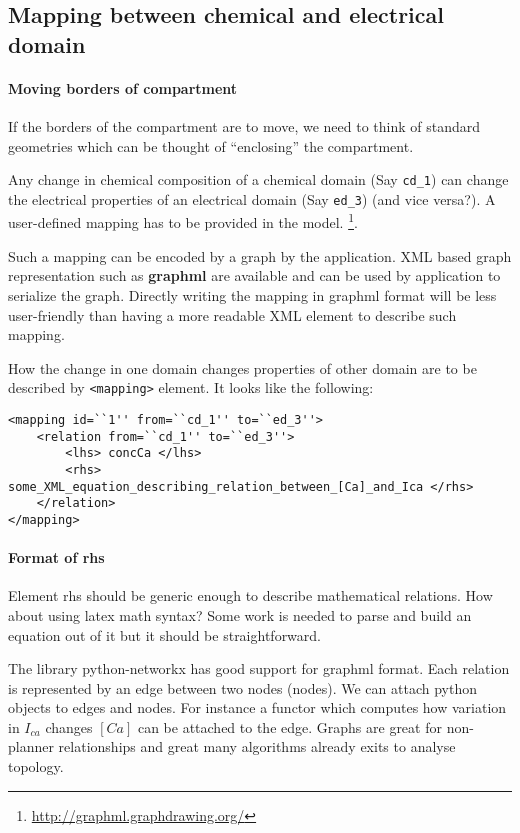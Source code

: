 \subsection{Mapping between chemical and electrical domain}

\paragraph{Moving borders of compartment}

    If the borders of the compartment are to move, we need to think of standard
    geometries which can be thought of ``enclosing'' the compartment.

Any change in chemical composition of a chemical domain (Say \texttt{cd\_1}) can
change the electrical properties of an electrical domain (Say \texttt{ed\_3})
(and vice versa?). A user-defined mapping has to be provided in the model.
\footnote{\url{http://graphml.graphdrawing.org/}}.


Such a mapping can be encoded by a graph by the application. XML based graph
representation such as \textbf{graphml} are available and can be used by
application to serialize the graph. Directly writing the mapping in graphml
format will be less user-friendly than having a more readable XML element to
describe such mapping.

How the change in one domain changes properties of other domain are to be
described by \texttt{<mapping>} element. It looks like the following:


\begin{verbatim}
<mapping id=``1'' from=``cd_1'' to=``ed_3''>
    <relation from=``cd_1'' to=``ed_3''>
        <lhs> concCa </lhs>
        <rhs> some_XML_equation_describing_relation_between_[Ca]_and_Ica </rhs>
    </relation>
</mapping>
\end{verbatim}

\paragraph{Format of rhs} Element rhs should be generic enough to describe
mathematical relations. How about using latex math syntax? Some work is needed
to parse and build an equation out of it but it should be straightforward. 


The library python-networkx has good support for graphml format. Each relation
is represented by an edge between two nodes (nodes). We can attach python
objects to edges and nodes. For instance a functor which computes how variation
in $I_{ca}$ changes $[Ca]$ can be attached to the edge. Graphs are great for
non-planner relationships and great many algorithms already exits to analyse
topology.


